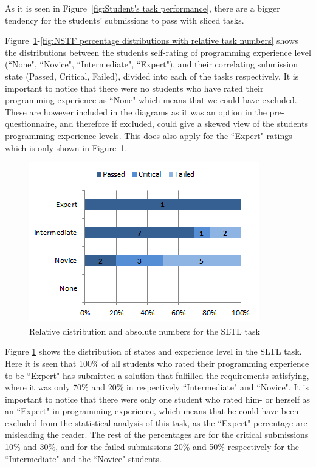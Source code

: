 \documentclass{sig-alternate-05-2015}
\begin{document}
As it is seen in Figure~\ref{fig:Student's task performance}, there are a bigger tendency for the students' submissions to pass with sliced tasks.

Figure~\ref{fig:SLTL percentage distributions with relative task numbers}-\ref{fig:NSTF percentage distributions with relative task numbers} shows the distributions between the students self-rating of programming experience level (``None", ``Novice", ``Intermediate", ``Expert"), and their correlating submission state (Passed, Critical, Failed), divided into each of the tasks respectively.
It is important to notice that there were no students who have rated their programming experience  as ``None" which means that we could have excluded. These are however included in the diagrams as it was an option in the pre-questionnaire, and therefore if excluded, could give a skewed view of the students programming experience levels. This does also apply for the ``Expert" ratings which is only shown in Figure~\ref{fig:SLTL percentage distributions with relative task numbers}.

\begin{figure}[!ht]
	\centering
	\includegraphics[width=1\linewidth]{img06}
	\caption{Relative distribution and absolute numbers for the SLTL task}
	\label{fig:SLTL percentage distributions with relative task numbers}
\end{figure}

Figure \ref{fig:SLTL percentage distributions with relative task numbers} shows the distribution of states and experience level in the SLTL task.
Here it is seen that 100\% of all students who rated their programming experience to be ``Expert" has submitted a solution that fulfilled the requirements satisfying, where it was only 70\% and 20\% in respectively ``Intermediate" and ``Novice".
It is important to notice that there were only one student who rated him- or herself as an ``Expert" in programming experience, which means that he could have been excluded from the statistical analysis of this task, as the ``Expert" percentage are misleading the reader. The rest of the percentages are for the critical submissions 10\% and 30\%, and for the failed submissions 20\% and 50\% respectively for the ``Intermediate" and the ``Novice" students.
\end{document}
